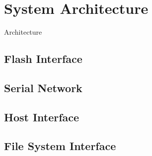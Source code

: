 \section{System Architecture}

Architecture

\subsection{Flash Interface}

\subsection{Serial Network}

\subsection{Host Interface}

\subsection{File System Interface}

